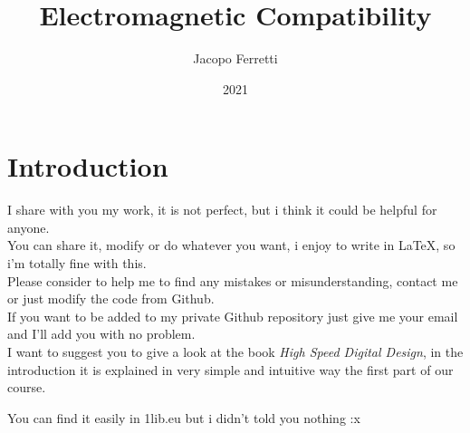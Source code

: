 \documentclass{article}
\title{Electromagnetic Compatibility}
\date{2021}
\author{Jacopo Ferretti}
\numberwithin{equation}{section}
\numberwithin{figure}{section}
\begin{document}
\maketitle
\begin{center}
  \Huge{}
\end{center}
\newpage
\tableofcontents
\newpage
\section*{Introduction}
I share with you my work, it is not perfect, but i think it could be helpful for anyone.\\
You can share it, modify or do whatever you want, i enjoy to write in \LaTeX, so i'm totally fine with this.\\
Please consider to help me to find any mistakes or misunderstanding, contact me or just modify the code from Github.\\
If you want to be added to my private Github repository just give me your email and I'll add you with no problem.\\
I want to suggest you to give a look at the book \emph{High Speed Digital Design}\cite{zhang_book}, in the introduction it is explained in very simple and intuitive way the first part of our course.\\
\begin{footnotesize}
  You can find it easily in 1lib.eu but i didn't told you nothing :x
\end{footnotesize}
\newpage









\medskip


\end{document}
